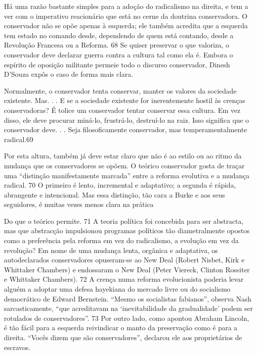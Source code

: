  \par 
Há uma razão bastante simples para a adoção do radicalismo na direita, e tem a ver com o imperativo reacionário que está no cerne da doutrina conservadora. O conservador não se opõe apenas à esquerda; ele também acredita que a esquerda tem estado no comando desde, dependendo de quem está contando, desde a Revolução Francesa ou a Reforma. {\color{blue}68} Se quiser preservar o que valoriza, o conservador deve declarar guerra contra a cultura tal como ela é. Embora o espírito de oposição militante permeie todo o discurso conservador, Dinesh D’Souza expôs o caso de forma mais clara.
 \par 
Normalmente, o conservador tenta conservar, manter os valores da sociedade existente. Mas. . . E se a sociedade existente for inerentemente hostil às crenças conservadoras? É tolice um conservador tentar conservar essa cultura. Em vez disso, ele deve procurar miná-lo, frustrá-lo, destruí-lo na raiz. Isso significa que o conservador deve. . . Seja filosoficamente conservador, mas temperamentalmente radical.{\color{blue}69}
 \par 
Por esta altura, também já deve estar claro que não é ao estilo ou ao ritmo da mudança que os conservadores se opõem. O teórico conservador gosta de traçar uma “distinção manifestamente marcada” entre a reforma evolutiva e a mudança radical. {\color{blue}70} O primeiro é lento, incremental e adaptativo; a segunda é rápida, abrangente e intencional. Mas essa distinção, tão cara a Burke e aos seus seguidores, é muitas vezes menos clara na prática
 \par 
Do que o teórico permite. {\color{blue}71} A teoria política foi concebida para ser abstracta, mas que abstracção impulsionou programas políticos tão diametralmente opostos como a preferência pela reforma em vez do radicalismo, a evolução em vez da revolução? Em nome de uma mudança lenta, orgânica e adaptativa, os autodeclarados conservadores opuseram-se ao New Deal (Robert Nisbet, Kirk e Whittaker Chambers) e endossaram o New Deal (Peter Viereck, Clinton Rossiter e Whittaker Chambers). {\color{blue}72} A crença numa reforma evolucionista poderia levar alguém a adoptar uma defesa hayekiana do mercado livre ou do socialismo democrático de Edward Bernstein. “Mesmo os socialistas fabianos”, observa Nash sarcasticamente, “que acreditavam na ‘inevitabilidade da gradualidade’ podem ser rotulados de conservadores”. {\color{blue}73} Por outro lado, como apontou Abraham Lincoln, é tão fácil para a esquerda reivindicar o manto da preservação como é para a direita. “Vocês dizem que são conservadores”, declarou ele aos proprietários de escravos.
